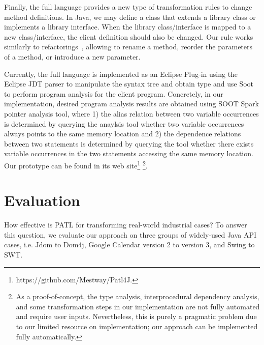 \documentclass[letterpaper, USenglish]{lipics-v2016}
\theoremstyle{plain}
\begin{document}
Finally, the full language provides a new type of transformation rules
to change method definitions. In Java, we may define a class that
extends a library class or implements a library interface. When the
library class/interface is mapped to a new class/interface, the client
definition should also be changed. Our rule works similarly to
refactorings~\cite{Henkel:2005:CCR:1062455.1062512}, allowing to
rename a method, reorder the parameters of a method, or introduce a
new parameter.

Currently, the full language is implemented as an Eclipse Plug-in
using the Eclipse JDT parser to manipulate the syntax tree and obtain
type and use Soot~\cite{Vallee-Rai:1999:SJB:781995.782008} to perform
program analysis for the client program. Concretely, in our implementation, desired program analysis results are obtained using SOOT Spark pointer analysis tool, where 1) the alias relation between two variable occurrences is determined by querying the anaylsis tool whether two variable occurrences always points to the same memory location and 2) the dependence relations between two statements is determined by querying the tool whether there exists variable occurrences in the two statements accessing the same memory location. Our prototype can be
found in its web site\footnote{https://github.com/Mestway/Patl4J.}
\footnote{As a proof-of-concept, the type analysis, interprocedural dependency
    analysis, and some transformation steps
   in our implementation are not fully automated and require
  user inputs. Nevertheless, this is purely a
  pragmatic problem due to our limited resource on implementation;
our approach can be implemented fully automatically.}. 

\section{Evaluation}
\label{sec:evaluation}

How effective is PATL for transforming real-world industrial cases? To
answer this question, we evaluate our approach
on three groups of widely-used Java API cases, i.e. Jdom to Dom4j,
Google Calendar version 2 to version 3, and Swing to SWT.
\end{document}
